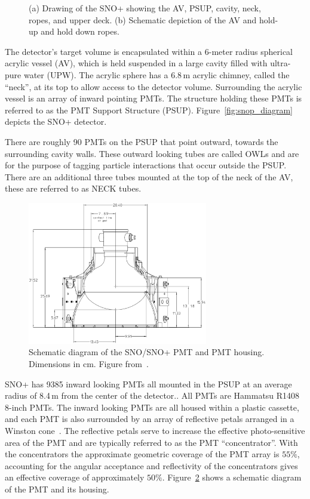 \begin{figure}[htbp]
\label{fig:snop_diagrams}
    \caption[SNO+ Detector]{(a) Drawing of the SNO+ showing the
    AV, PSUP, cavity, neck, ropes, and upper deck. (b) Schematic
    depiction of the AV and hold-up and hold down ropes.}
\end{figure}

The detector's target volume is encapsulated within a 6-meter radius spherical acrylic vessel (AV),
which is held suspended in a large cavity filled with ultra-pure water (UPW)\@.
The acrylic sphere has a 6.8\,m acrylic chimney, called the ``neck'', at its top
to allow access to the detector volume.
Surrounding the acrylic vessel is an  array of inward pointing PMTs.
The structure holding these PMTs is referred to as the PMT Support Structure
(PSUP).
Figure~\ref{fig:snop_diagram} depicts the SNO+ detector.

There are roughly 90 PMTs on the PSUP that point outward, towards the surrounding cavity
walls.
These outward looking tubes are called OWLs and are for the purpose of tagging
particle interactions that occur outside the PSUP\@.
There are an additional three tubes mounted at the top of the neck of the AV,
these are referred to as NECK tubes.


\begin{figure}[htbp]
    \centering
    \includegraphics[width=0.7\textwidth]{sno_casette}
    \caption[PMT Casette] {Schematic diagram of the SNO/SNO+ PMT and
    PMT housing. Dimensions in cm. Figure from~\citep{sno_detector_paper}.}
\label{fig:sno_pmt_casette}
\end{figure}

SNO+ has 9385 inward looking PMTs all mounted in the PSUP at an average radius
of 8.4\,m from the center of the detector..
All PMTs are Hammatsu R1408 8-inch PMTs.
The inward looking PMTs are all housed within a plastic cassette,
and each PMT is also surrounded by an array of reflective
petals arranged in a Winston cone~\cite{winston}.
The reflective petals serve to increase the effective photo-sensitive area
of the PMT and are typically referred to as the PMT ``concentrator''.
With the concentrators the approximate geometric coverage of the PMT array is $55\%$,
accounting for the angular acceptance and reflectivity of the concentrators gives
an effective coverage of approximately $50\%$.
Figure~\ref{fig:sno_pmt_casette} shows a schematic diagram of the PMT and
its housing.

